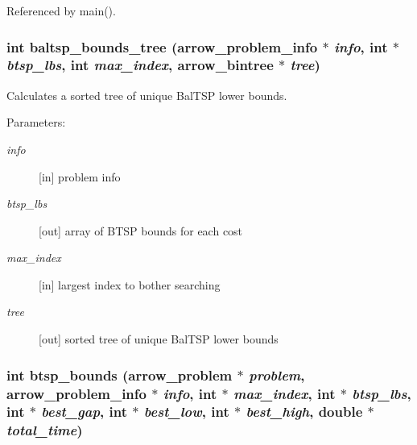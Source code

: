 Referenced by main().\hypertarget{lib_2baltsp_2baltsp-ib2_8c_f169c033b4bdc2c08c544daf0e91aa9a}{
\subsubsection[{baltsp\_\-bounds\_\-tree}]{\setlength{\rightskip}{0pt plus 5cm}int baltsp\_\-bounds\_\-tree ({\bf arrow\_\-problem\_\-info} $\ast$ {\em info}, \/  int $\ast$ {\em btsp\_\-lbs}, \/  int {\em max\_\-index}, \/  {\bf arrow\_\-bintree} $\ast$ {\em tree})}}
\label{lib_2baltsp_2baltsp-ib2_8c_f169c033b4bdc2c08c544daf0e91aa9a}


Calculates a sorted tree of unique BalTSP lower bounds. 

\begin{Desc}
\item[Parameters:]
\begin{description}
\item[{\em info}]\mbox{[}in\mbox{]} problem info \item[{\em btsp\_\-lbs}]\mbox{[}out\mbox{]} array of BTSP bounds for each cost \item[{\em max\_\-index}]\mbox{[}in\mbox{]} largest index to bother searching \item[{\em tree}]\mbox{[}out\mbox{]} sorted tree of unique BalTSP lower bounds \end{description}
\end{Desc}
\hypertarget{lib_2baltsp_2baltsp-ib2_8c_793295ba41f25b193913629e408dd58e}{
\subsubsection[{btsp\_\-bounds}]{\setlength{\rightskip}{0pt plus 5cm}int btsp\_\-bounds ({\bf arrow\_\-problem} $\ast$ {\em problem}, \/  {\bf arrow\_\-problem\_\-info} $\ast$ {\em info}, \/  int $\ast$ {\em max\_\-index}, \/  int $\ast$ {\em btsp\_\-lbs}, \/  int $\ast$ {\em best\_\-gap}, \/  int $\ast$ {\em best\_\-low}, \/  int $\ast$ {\em best\_\-high}, \/  double $\ast$ {\em total\_\-time})}}
\label{lib_2baltsp_2baltsp-ib2_8c_793295ba41f25b193913629e408dd58e}


